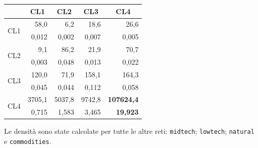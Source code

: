 \documentclass[]{article}
\begin{document}
\begin{multicols}{2}
\begin{table}[H]
\begin{tabular}{@{}lrrrr@{}}
			\toprule
			& \multicolumn{1}{c}{CL1} & \multicolumn{1}{c}{CL2} & \multicolumn{1}{c}{CL3} & \multicolumn{1}{c}{CL4} \\ \midrule
			\multirow{2}{*}{CL1} & 58,0                    & 6,2                     & 18,6                    & 26,6                    \\
			& 0,012                   & 0,002                   & 0,007                   & 0,005                   \\ \midrule
			\multirow{2}{*}{CL2} & 9,1                     & 86,2                    & 21,9                    & 70,7                    \\
			& 0,003                   & 0,048                   & 0,013                   & 0,022                   \\ \midrule
			\multirow{2}{*}{CL3} & 120,0                   & 71,9                    & 158,1                   & 164,3                   \\
			& 0,045                   & 0,044                   & 0,112                   & 0,058                   \\ \midrule
			\multirow{2}{*}{CL4} & 3705,1                  & 5037,8                  & 9742,8                  & \textbf{107624,4}       \\
			& 0,715                   & 1,583                   & 3,465                   & \textbf{19,923}         \\ \bottomrule
		\end{tabular}
	\end{table}
	Le densità sono state calcolate per tutte le altre reti: \texttt{midtech}; \texttt{lowtech}; \texttt{natural} e \texttt{commodities}.
	

\end{multicols}
\end{document}
